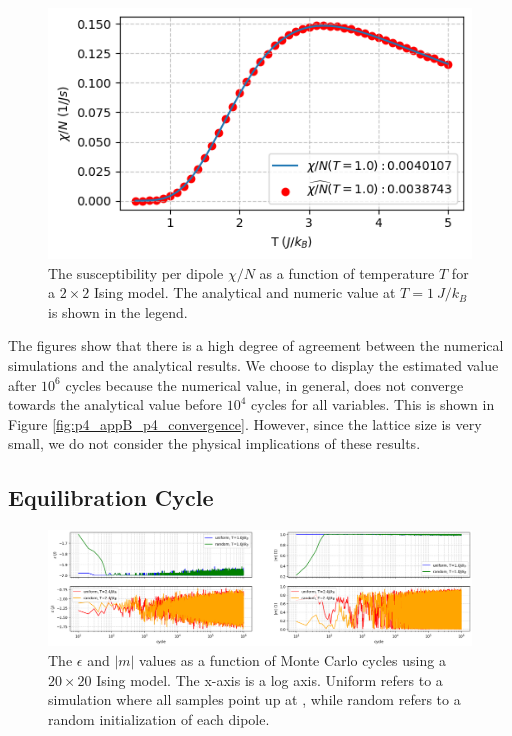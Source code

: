 \documentclass[../main_proj4_correct_template.tex]{subfiles}
\begin{document}
\begin{figure}[h!]
    \centering
    \includegraphics[width=0.8\linewidth]{Project 4/figures/p4_chi.png}
    \caption{The susceptibility per dipole $\chi/N$ as a function of temperature $T$ for a $2\times 2$ Ising model. The analytical and numeric value at $T=1~J/k_B$ is shown in the legend.}
    \label{fig:p4_chi}
\end{figure}

The figures show that there is a high degree of agreement between the numerical simulations and the analytical results. We choose to display the estimated value after $10^{6}$ cycles because the numerical value, in general, does not converge towards the analytical value before $10^{4}$ cycles for all variables. This is shown in Figure \ref{fig:p4_appB_p4_convergence}. However, since the lattice size is very small, we do not consider the physical implications of these results.

\subsection{Equilibration Cycle}

\begin{figure}[htb!]
    \centering
    \includegraphics[width=0.95\linewidth]{Project 4/figures/p5_equilibration_rawvalues.png}
    \caption{The $\epsilon$ and $|m|$ values as a function of Monte Carlo cycles using a $20\times 20$ Ising model. The x-axis is a log axis. Uniform refers to a simulation where all samples point up at , while random refers to a random initialization of each dipole. }
    \label{fig:p4_p5_equilibration}
\end{figure}
\end{document}
